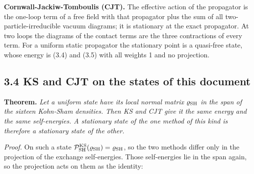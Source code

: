 \documentclass[
  10pt,
]{article}
\begin{document}
\textbf{Cornwall-Jackiw-Tomboulis (CJT).} The effective action of the
propagator is the one-loop term of a free field with that propagator
plus the sum of all two-particle-irreducible vacuum diagrams; it is
stationary at the exact propagator. At two loops the diagrams of the
contact terms are the three contractions of every term. For a uniform
static propagator the stationary point is a quasi-free state, whose
energy is (3.4) and (3.5) with all weights 1 and no projection.

\hypertarget{ks-and-cjt-on-the-states-of-this-document}{%
\subsection{3.4 KS and CJT on the states of this
document}\label{ks-and-cjt-on-the-states-of-this-document}}

\textbf{Theorem.} \emph{Let a uniform state have its local normal matrix
\(\varrho_{\rm SH}\) in the span of the sixteen Kohn-Sham densities.
Then KS and CJT give it the same energy and the same self-energies. A
stationary state of the one method of this kind is therefore a
stationary state of the other.}

\emph{Proof.} On such a state
\(\mathcal P^{\rm KS}_{\rm SH}(\varrho_{\rm SH})=\varrho_{\rm SH}\), so
the two methods differ only in the projection of the exchange
self-energies. Those self-energies lie in the span again, so the
projection acts on them as the identity:
\end{document}
